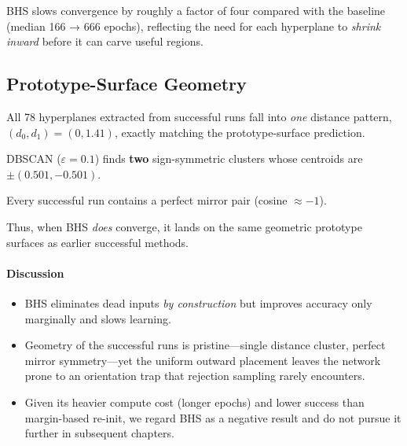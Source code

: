 BHS slows convergence by roughly a factor of four compared with the
baseline (median 166 → 666 epochs), reflecting the need for each
hyperplane to \emph{shrink inward} before it can carve useful regions.

\subsection*{Prototype-Surface Geometry}

\begin{description}[leftmargin=2em]
  \item[Distance clusters]
        All 78 hyperplanes extracted from successful runs fall into
        \emph{one} distance pattern,
        \((d_{0},d_{1})\!=\!(0,1.41)\),
        exactly matching the prototype-surface prediction.
  \item[Weight clusters]
        DBSCAN ($\varepsilon=0.1$) finds \textbf{two}
        sign-symmetric clusters whose centroids are
        $\pm(0.501,-0.501)$.%
  \item[Mirror symmetry]
        Every successful run contains a perfect mirror pair
        (cosine $\approx -1$).%
\end{description}

Thus, when BHS \emph{does} converge, it lands on the
same geometric prototype surfaces as earlier successful methods.

\paragraph{Discussion}
\begin{itemize}
  \item BHS eliminates dead inputs \emph{by construction} but improves
        accuracy only marginally and slows learning.
  \item Geometry of the successful runs is pristine—single distance
        cluster, perfect mirror symmetry—yet the uniform outward
        placement leaves the network prone to an orientation trap that
        rejection sampling rarely encounters.
  \item Given its heavier compute cost (longer epochs) and lower success
        than margin-based re-init, we regard BHS as a negative result and
        do not pursue it further in subsequent chapters.
\end{itemize}

\hrulefill
